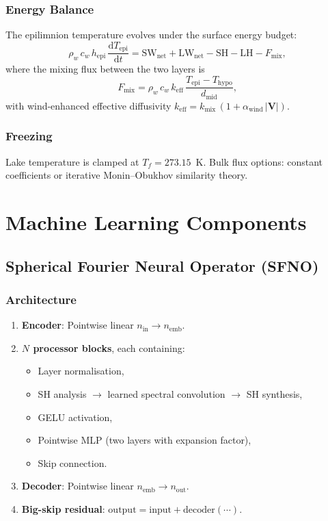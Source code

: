 \documentclass[11pt,twoside]{report}
\newcommand{\dd}{\mathrm{d}}
\newcommand{\vect}[1]{\bm{#1}}
\begin{document}
\subsection{Energy Balance}
The epilimnion temperature evolves under the surface energy budget:
\begin{equation}
  \rho_w\,c_w\,h_{\mathrm{epi}}\,\frac{\dd T_{\mathrm{epi}}}{\dd t}
  = \mathrm{SW}_{\mathrm{net}} + \mathrm{LW}_{\mathrm{net}} - \mathrm{SH} - \mathrm{LH} - F_{\mathrm{mix}},
\end{equation}
where the mixing flux between the two layers is
\begin{equation}
  F_{\mathrm{mix}} = \rho_w\,c_w\,k_{\mathrm{eff}}\,\frac{T_{\mathrm{epi}}-T_{\mathrm{hypo}}}{d_{\mathrm{mid}}},
\end{equation}
with wind-enhanced effective diffusivity
$k_{\mathrm{eff}} = k_{\mathrm{mix}}\,(1+\alpha_{\mathrm{wind}}\,|\vect{V}|)$.

\subsection{Freezing}
Lake temperature is clamped at $T_f = 273.15$~K.  Bulk flux options:
constant coefficients or iterative Monin--Obukhov similarity theory.


\chapter{Machine Learning Components}
\label{ch:ml}

\section{Spherical Fourier Neural Operator (SFNO)}

\subsection{Architecture}
\begin{enumerate}[nosep]
  \item \textbf{Encoder}: Pointwise linear $n_{\mathrm{in}}\to n_{\mathrm{emb}}$.
  \item \textbf{$N$ processor blocks}, each containing:
    \begin{itemize}[nosep]
      \item Layer normalisation,
      \item SH analysis $\to$ learned spectral convolution $\to$ SH synthesis,
      \item GELU activation,
      \item Pointwise MLP (two layers with expansion factor),
      \item Skip connection.
    \end{itemize}
  \item \textbf{Decoder}: Pointwise linear $n_{\mathrm{emb}}\to n_{\mathrm{out}}$.
  \item \textbf{Big-skip residual}: $\text{output}=\text{input}+\text{decoder}(\cdots)$.
\end{enumerate}
\end{document}
